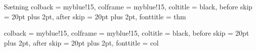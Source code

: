 {Sætning}
{
colback		= myblue!15,
colframe	= myblue!15,
coltitle	= black,
before skip	= 20pt plus 2pt,
after skip	= 20pt plus 2pt,
fonttitle	= \bfseries
}
{thm}

{}
{
colback		= myblue!15,
colframe	= myblue!15,
coltitle	= black,
before skip	= 20pt plus 2pt,
after skip	= 20pt plus 2pt,
fonttitle	= \bfseries
}
{col}


\newcommand{\imgfig}[3][0.75]{
  \begin{figure}[htbp]
    \centering
    \texttt{[image: fig/img/\#2]}
    \caption{#3}
    \label{fig:#2}
  \end{figure}
}

\newcommand{\dimgfig}[5][0.5]{
  \ifx\dimgleftwidth\undefined
    \newlength{\dimgleftwidth}
    \newlength{\dimgrightwidth}
  \fi
  \setlength{\dimgleftwidth}{#1\textwidth-0.02\textwidth}
  \setlength{\dimgrightwidth}{0.96\textwidth-\dimgleftwidth}
  \begin{figure}[htbp]
    \centering
    \begin{minipage}[t]{\dimgleftwidth}
      \centering
      \texttt{[image: fig/img/\#2]}
      \caption{#3}
      \label{fig:#2}
    \end{minipage}
    \hfill
    \begin{minipage}[t]{\dimgrightwidth}
      \centering
      \texttt{[image: fig/img/\#4]}
      \caption{#5}
      \label{fig:#4}
    \end{minipage}
  \end{figure}
}
